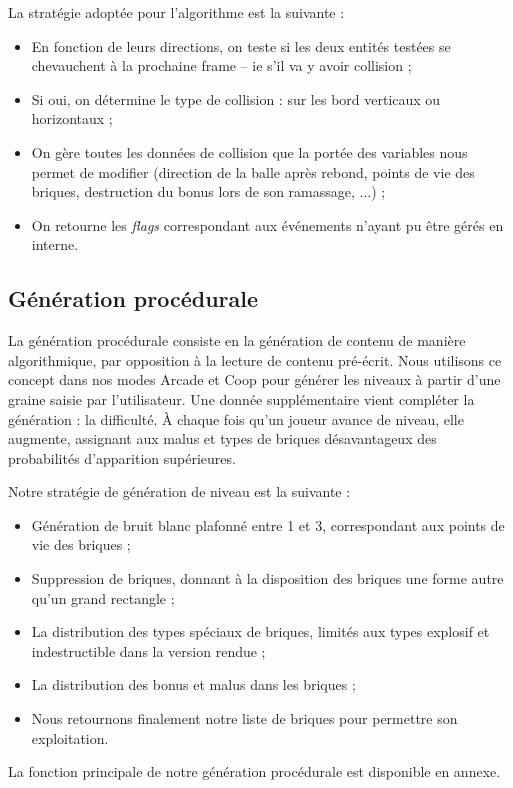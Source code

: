   La stratégie adoptée pour l'algorithme est la suivante :
  \begin{itemize}
    \item En fonction de leurs directions, on teste si les deux entités testées se chevauchent à la prochaine frame -- ie s'il va y avoir collision ;
    \item Si oui, on détermine le type de collision : sur les bord verticaux ou horizontaux ;
    \item On gère toutes les données de collision que la portée des variables nous permet de modifier (direction de la balle après rebond, points de vie des briques, destruction du bonus lors de son ramassage, ...) ;
    \item On retourne les {\em flags} correspondant aux événements n'ayant pu être gérés en interne.
  \end{itemize} 

  \subsection{Génération procédurale}
	La génération procédurale consiste en la génération de contenu de manière algorithmique, par opposition à la lecture de contenu pré-écrit. Nous utilisons ce concept dans nos modes Arcade et Coop pour générer les niveaux à partir d'une graine saisie par l'utilisateur. Une donnée supplémentaire vient compléter la génération : la difficulté. À chaque fois qu'un joueur avance de niveau, elle augmente, assignant aux malus et types de briques désavantageux des probabilités d'apparition supérieures.


    Notre stratégie de génération de niveau est la suivante :
	\begin{itemize}
    \item Génération de bruit blanc plafonné entre 1 et 3, correspondant aux points de vie des briques ;
    \item Suppression de briques, donnant à la disposition des briques une forme autre qu'un grand rectangle ;
    \item La distribution des types spéciaux de briques, limités aux types explosif et indestructible dans la version rendue ;
    \item La distribution des bonus et malus dans les briques ;
    \item Nous retournons finalement notre liste de briques pour permettre son exploitation.
	\end{itemize}
    La fonction principale de notre génération procédurale est disponible en annexe.
